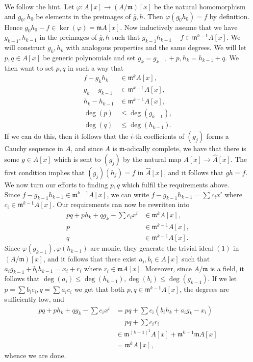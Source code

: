 \documentclass{article}
\let\temp\phi
\let\phi\varphi
\let\varphi\temp
\theoremstyle{definition}
\begin{document}
We follow the hint. Let $\phi : A[x] \to (A/\mathfrak{m})[x]$ be the natural
homomorphism and $g_0, h_0$ be elements in the preimages of $\overline{g},
\overline{h}$. Then $\phi(g_0h_0) = \overline{f}$ by definition. Hence $g_0h_0
- f \in \ker(\phi) = \mathfrak{m}A[x]$. Now inductively assume that we have
$g_{k-1}, h_{k-1}$ in the preimages of $\overline{g}, \overline{h}$ such that
$g_{k-1}h_{k-1} - f \in \mathfrak{m}^{k - 1}A[x]$. We will construct $g_k, h_k$
with analogous properties and the same degrees. We will let $p, q \in A[x]$ be
generic polynomials and set $g_k = g_{k-1} + p, h_k = h_{k - 1} + q$. We then
want to set $p, q$ in such a way that
\begin{align*}
	f - g_kh_k &\in \mathfrak{m}^{k}A[x], \\
	g_k - g_{k - 1} &\in \mathfrak{m}^{k - 1}A[x], \\
	h_k - h_{k - 1} &\in \mathfrak{m}^{k - 1}A[x], \\
	\deg(p) &\leq \deg(g_{k-1}), \\
	\deg(q) &\leq \deg(h_{k-1}).
\end{align*}
If we can do this, then it follows that the $i$-th coefficients of $(g_j)$
forms a Cauchy sequence in $A$, and since $A$ is $\mathfrak{m}$-adically
complete, we have that there is some $g \in A[x]$ which is sent to $(g_j)$ by
the natural map $A[x] \to \hat{A}[x]$. The first condition implies that
$(g_j)(h_j) = f$ in $\hat{A}[x]$, and it follows that $gh = f$. We now turn our
efforts to finding $p, q$ which fulfil the requirements above. \\

Since $f - g_{k-1}h_{k-1} \in \mathfrak{m}^{k - 1}A[x]$, we can write
$f - g_{k-1}h_{k-1} = \sum c_i x^{i}$ where $c_i \in \mathfrak{m}^{k-1}A[x]$.
Our requirements can now be rewritten into
\begin{align*}
	pq + ph_k + qg_k - \sum c_i x^{i} &\in \mathfrak{m}^{k}A[x], \\
	p &\in \mathfrak{m}^{k - 1}A[x], \\
	q &\in \mathfrak{m}^{k - 1}A[x].
\end{align*}
Since $\phi(g_{k-1}), \phi(h_{k-1})$ are monic, they generate the trivial ideal
$(1)$ in $(A/\mathfrak{m})[x]$, and it follows that there exist $a_i, b_i \in
A[x]$ such that $a_i g_{k-1} + b_i h_{k - 1} = x_i + r_i$ where $r_i \in
\mathfrak{m}A[x]$. Moreover, since $A/\mathfrak{m}$ is a field,
it follows that $\deg(a_i) \leq \deg(h_{k-1}), \deg(b_i) \leq \deg(g_{k - 1})$.
If we let $p = \sum b_i c_i , q = \sum a_i c_i$ we get that both $p, q \in
\mathfrak{m}^{k-1}A[x]$, the degrees are sufficiently low, and
\begin{align*}
	pq + ph_k + qg_k - \sum c_i x^{i}
	&=
	pq + \sum c_i (
		b_i h_k
		+
		a_i g_k
		-
		x_i
	) \\
	&=
	pq + \sum c_i r_i \\
	&\in
	\mathfrak{m}^{(k - 1)^{2}}A[x] + \mathfrak{m}^{k-1}\mathfrak{m}A[x] \\
	&=
	\mathfrak{m}^{k}A[x],
\end{align*}
whence we are done.
\end{document}
